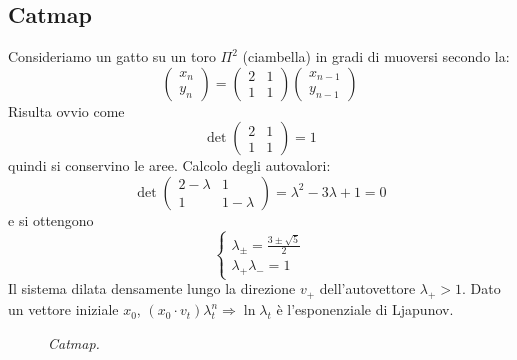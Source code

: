 \documentclass[12pt, a4paper]{book}
\theoremstyle{theorem}
\begin{document}
			\subsection{Catmap}
				Consideriamo un gatto su un toro $\Pi^{2}$ (ciambella) in gradi di muoversi secondo la:
				\begin{equation*}
					\left(
					\begin{matrix}
						x_{n} \\
						y_{n} 
					\end{matrix}
					\right)=
					\left(
					\begin{matrix}
						2 & 1\\
						1 & 1 
					\end{matrix}
					\right)
					\left(
					\begin{matrix}
						x_{n-1} \\
						y_{n-1} 
					\end{matrix}
					\right)
				\end{equation*}
				Risulta ovvio come
				\begin{equation*}
					\det
					\left(
						\begin{matrix}
							2 & 1\\
							1 & 1 
						\end{matrix}
					\right)=1
				\end{equation*}
				quindi si conservino le aree.
				Calcolo degli autovalori:
				\begin{equation*}
					\det
					\left(
						\begin{matrix}
							2-\lambda & 1\\
							1 & 1-\lambda
						\end{matrix}
					\right)=\lambda^{2}-3\lambda+1=0
				\end{equation*}
				e si ottengono
				\begin{equation*}
					\begin{cases}
						\lambda_{\pm}=\frac{3\pm\sqrt{5}}{2}\\
						\lambda_{+}\lambda_{-}=1
					\end{cases}
				\end{equation*}
				Il sistema dilata densamente lungo la direzione $v_{+}$ dell'autovettore $\lambda_{+}>1$.
				Dato un vettore iniziale $x_{0}$, $(x_{0}\cdot v_{t})\lambda_{t}^{n} \Rightarrow \ln\lambda_{t}$ è l'esponenziale di Ljapunov.
				\begin{figure}[H]
					\centering
					\caption{\emph{Catmap.}}
					\label{figure:catmap}
				\end{figure}
\end{document}
